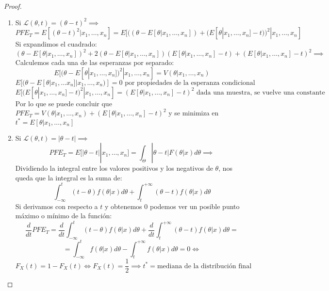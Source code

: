 \begin{proof}
  \begin{enumerate}
    \item Si $\mathcal{L}(\theta, t) = (\theta - t)^2 \implies$ $$PFE_T = E[(\theta -
                t)^2 | x_1, \ldots, x_n] = E[((\theta - E[\theta | x_1, \ldots, x_n]) +
                (E[\theta | x_1, \ldots, x_n] - t))^2 | x_1, \ldots, x_n] $$ Si expandimos el
          cuadrado: $$ (\theta - E[\theta | x_1, \ldots, x_n])^2 + 2(\theta - E[\theta |
                x_1, \ldots, x_n])(E[\theta | x_1, \ldots, x_n] - t) + (E[\theta | x_1, \ldots,
                x_n] - t)^2 \implies$$ Calculemos cada una de las esperanzas por separado:
          $$E[(\theta - E[\theta | x_1, \ldots, x_n])^2 | x_1, \ldots, x_n] = V(\theta |
            x_1, \ldots, x_n)$$ $$E[(\theta - E[\theta | x_1, \ldots x_n] | x_1, \ldots,
                x_n)] = 0 \text{ por propiedades de la esperanza condicional}$$ $$E[(E[\theta |
                    x_1, \ldots, x_n] - t)^2 | x_1, \ldots, x_n] = (E[\theta | x_1, \ldots, x_n] -
            t)^2 \text{ dada una muestra, se vuelve una constante}$$ Por lo que se puede
          concluir que $PFE_T = V(\theta | x_1, \ldots, x_n) + (E[\theta | x_1, \ldots,
                x_n] - t)^2$ y se minimiza en $t^* = E[\theta | x_1, \ldots, x_n]$
    \item Si $\mathcal{L}(\theta, t) = |\theta - t| \implies$ $$PFE_T = E[|\theta - t| |
                x_1, \ldots, x_n] = \int_{\Theta} |\theta - t|F(\theta | x)d\theta \implies$$
          Dividiendo la integral entre los valores positivos y los negativos de $\theta$,
          nos queda que la integral es la suma de: $$\int_{-\infty}^{t} (t -
            \theta)f(\theta | x)d\theta + \int_{t}^{+\infty} (\theta - t)f(\theta |
            x)d\theta$$ Si derivamos con respecto a $t$ y obtenemos $0$ podemos ver un
          posible punto máximo o mínimo de la función: $$\frac{d}{dt}PFE_T = \frac{d}{dt}
            \int_{-\infty}^{t} (t - \theta)f(\theta | x)d\theta + \frac{d}{dt}
            \int_{t}^{+\infty} (\theta - t)f(\theta | x)d\theta = $$ $$ =
            \int_{-\infty}^{t} f(\theta | x)d\theta - \int_{t}^{+\infty} f(\theta |
            x)d\theta = 0 \iff$$ $$F_X(t) = 1 - F_X(t) \iff F_X(t) = \frac{1}{2} \implies
            t^* = \text{mediana de la distribución final}$$
  \end{enumerate}
\end{proof}


